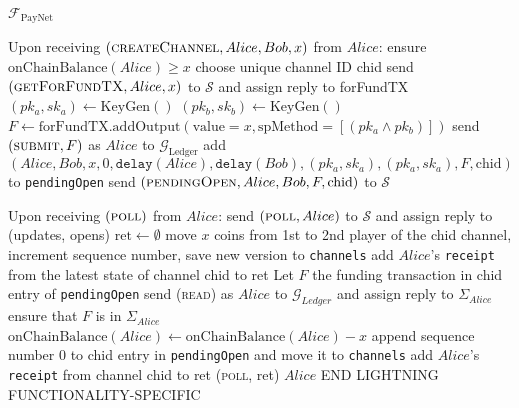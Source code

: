 \begin{functionality}{$\mathcal{F}_{\mathrm{PayNet}}$}
\begin{algorithmic}[1]
    \State Upon receiving $\left(\textsc{createChannel}, Alice, Bob, x\right)$
    from $Alice$:
    \Indent
      \State ensure $\mathrm{onChainBalance}\left(Alice\right) \geq x$
      \State choose unique channel ID chid
      \State send $\left(\textsc{getForFundTX}, Alice, x\right)$ to
      $\mathcal{S}$ and assign reply to forFundTX
      \State $\left(pk_a, sk_a\right) \gets \mathrm{KeyGen}\left(\right)$
      \State $\left(pk_b, sk_b\right) \gets \mathrm{KeyGen}\left(\right)$
      \State $F \gets \mathrm{forFundTX}.\mathrm{addOutput}\left(\mathrm{value}
      = x, \mathrm{spMethod} = \left[\left(pk_a \wedge
      pk_b\right)\right]\right)$
      \State send $\left(\textsc{submit}, F\right)$ as $Alice$ to
      $\mathcal{G}_{\mathrm{Ledger}}$
      \State add $\left(Alice, Bob, x, 0, \mathtt{delay}\left(Alice\right),
      \mathtt{delay}\left(Bob\right), \left(pk_a, sk_a\right), \left(pk_a,
      sk_a\right), F, \mathrm{chid}\right)$ to \texttt{pendingOpen}
      \State send $\left(\textsc{pendingOpen}, Alice, Bob, F,
      \mathrm{chid}\right)$ to $\mathcal{S}$ 
    \EndIndent
    \State

    \State Upon receiving $\left(\textsc{poll}\right)$ from $Alice$:
    \Indent
      \State send $\left(\textsc{poll}, Alice\right)$ to $\mathcal{S}$ and
      assign reply to (updates, opens)
      \State $\mathrm{ret} \gets \emptyset$
          \State move $x$ coins from 1st to 2nd player of the chid channel,
          increment sequence number, save new version to \texttt{channels}
        \EndIf
        \State add $Alice$'s \texttt{receipt} from the latest state of channel
        chid to ret
      \EndFor
          \State Let $F$ the funding transaction in chid entry of
          \texttt{pendingOpen}
          \State send (\textsc{read}) as $Alice$ to $\mathcal{G}_{Ledger}$ and
          assign reply to $\Sigma_{Alice}$
          \State ensure that $F$ is in $\Sigma_{Alice}$
          \State $\mathrm{onChainBalance}\left(Alice\right) \gets
          \mathrm{onChainBalance}\left(Alice\right) - x$
          \State append sequence number 0 to chid entry in \texttt{pendingOpen}
          and move it to \texttt{channels}
        \EndIf
        \State add $Alice$'s \texttt{receipt} from channel chid to ret
      \EndFor
      \State \Return (\textsc{poll}, ret) $Alice$
    \EndIndent
    \State END LIGHTNING FUNCTIONALITY-SPECIFIC
    \State


\end{algorithmic}
\end{functionality}

